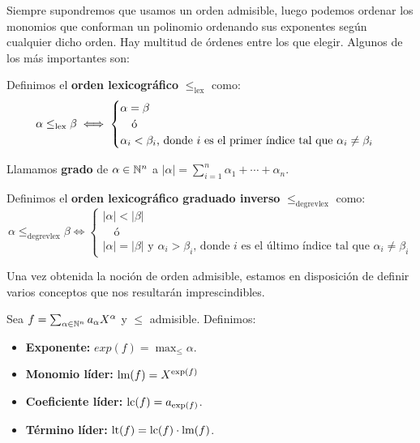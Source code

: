 Siempre supondremos que usamos un orden admisible, luego podemos ordenar los monomios que conforman un polinomio ordenando sus exponentes según cualquier dicho orden. Hay multitud de órdenes entre los que elegir. Algunos de los más importantes son:

\begin{ejemplo}
    Definimos el \textbf{orden lexicográfico} $\le_{\text{lex}}$ como:
    \begin{equation*}
        \alpha \le_{\text{lex}} \beta \iff \begin{cases}
            \alpha  = \beta \\
            \quad\text{ó}   \\
            \alpha_i < \beta_i \text{, donde $i$ es el primer índice tal que } \alpha_i \neq \beta_i
        \end{cases}
    \end{equation*}
\end{ejemplo}

\begin{definicion}
    Llamamos \textbf{grado} de $\alpha\in\mathbb{N}^n$ a $\vert \alpha\vert = \sum_{i=1}^n \alpha_1+\cdots + \alpha_n$.
\end{definicion}
\begin{ejemplo}
    Definimos el \textbf{orden lexicográfico graduado inverso} $\le_{\text{degrevlex}}$ como:
    \begin{equation*}
        \alpha \le_{\text{degrevlex}} \beta \iff \begin{cases}
            |\alpha| < |\beta| \\
            \quad\text{ó}   \\
            |\alpha| = |\beta| \text{ y } \alpha_i > \beta_i \text{, donde $i$ es el último índice tal que } \alpha_i \neq \beta_i
        \end{cases}
    \end{equation*}
\end{ejemplo}

Una vez obtenida la noción de orden admisible, estamos en disposición de definir varios conceptos que nos resultarán imprescindibles.

\begin{definicion}
    Sea $f= \sum_{\alpha\in \mathbb{N}^n} a_{\alpha} X^{\alpha}$ y $\le$ admisible. Definimos:
    \begin{itemize}
        \item \textbf{Exponente:} $exp(f) = \max_{\le}\alpha$.
        \item \textbf{Monomio líder:} $\text{lm}(f) = X^{\text{exp}(f)}$
        \item \textbf{Coeficiente líder:} $\text{lc}(f) = a_{\text{exp}(f)}$.
        \item \textbf{Término líder:} $\text{lt}(f) = \text{lc}(f) \cdot \text{lm}(f)$.
    \end{itemize}
\end{definicion}

